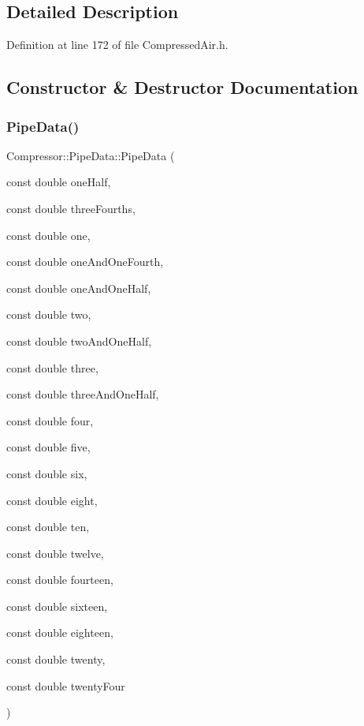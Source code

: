 \subsection{Detailed Description}


Definition at line 172 of file Compressed\+Air.\+h.



\subsection{Constructor \& Destructor Documentation}
\mbox{\label{struct_compressor_1_1_pipe_data_a2eb8afee8f68dd54dd1bf4d89b3188d9}} 
\subsubsection{\texorpdfstring{Pipe\+Data()}{PipeData()}\hspace{0.1cm}{\footnotesize\ttfamily [1/6]}}
{\footnotesize\ttfamily Compressor\+::\+Pipe\+Data\+::\+Pipe\+Data (\begin{DoxyParamCaption}\item[{const double}]{one\+Half,  }\item[{const double}]{three\+Fourths,  }\item[{const double}]{one,  }\item[{const double}]{one\+And\+One\+Fourth,  }\item[{const double}]{one\+And\+One\+Half,  }\item[{const double}]{two,  }\item[{const double}]{two\+And\+One\+Half,  }\item[{const double}]{three,  }\item[{const double}]{three\+And\+One\+Half,  }\item[{const double}]{four,  }\item[{const double}]{five,  }\item[{const double}]{six,  }\item[{const double}]{eight,  }\item[{const double}]{ten,  }\item[{const double}]{twelve,  }\item[{const double}]{fourteen,  }\item[{const double}]{sixteen,  }\item[{const double}]{eighteen,  }\item[{const double}]{twenty,  }\item[{const double}]{twenty\+Four }\end{DoxyParamCaption})\hspace{0.3cm}{\ttfamily [inline]}}

